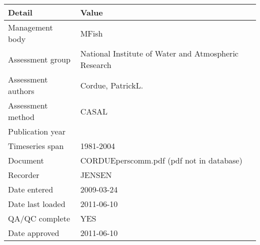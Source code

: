 \begin{table}[htb]
\centering
\begin{tabular}{lp{7cm}}
\toprule
Detail & Value \\
\midrule
Management body    & MFish                                                \\
Assessment group   & National Institute of Water and Atmospheric Research \\
Assessment authors & Cordue, PatrickL.                                    \\
Assessment method  & CASAL                                                \\
Publication year   &                                                      \\
Timeseries span    & 1981-2004                                            \\
Document           & CORDUEperscomm.pdf (pdf not in database)             \\
Recorder           & JENSEN                                               \\
Date entered       & 2009-03-24                                           \\
Date last loaded   & 2011-06-10                                           \\
QA/QC complete     & YES                                                  \\
Date approved      & 2011-06-10                                           \\
\bottomrule
\end{tabular}
\label{tab:assessdet}
\end{table}
